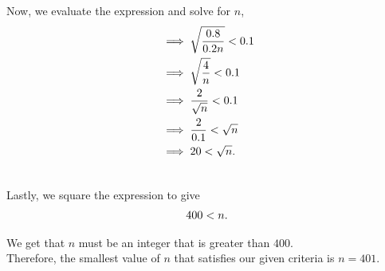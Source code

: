 \begin{subquestions}
\begin{subsubquestions}
Now, we evaluate the expression and solve for $n$,
\begin{align}
		&\implies \sqrt{\frac{0.8}{0.2n}}<0.1 \nonumber \\
		&\implies \sqrt{\frac{4}{n}}<0.1 \nonumber \\
		&\implies \frac{2}{\sqrt{n}}<0.1 \nonumber \\
		&\implies \frac{2}{0.1}<\sqrt{n} \nonumber \\
		&\implies 20<\sqrt{n}.  \\ \nonumber
	\end{align}

Lastly, we square the expression to give
\begin{align}
	400<n. \nonumber 
\end{align}

We get that $n$ must be an integer that is greater than $400$. \\
Therefore, the smallest value of $n$ that satisfies our given criteria is $n=401$. \\

	\end{subsubquestions}  
\end{subquestions}

